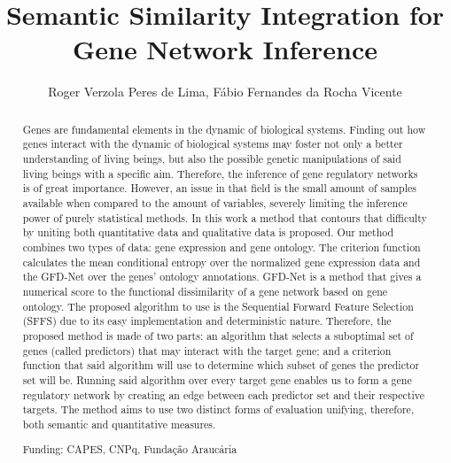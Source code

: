 \documentclass[twoside]{article}
\title{\vspace{-15mm}\fontsize{24pt}{10pt}\selectfont\textbf{ Semantic Similarity Integration for Gene Network Inference }} %
\author{ Roger Verzola Peres de Lima, F\'abio Fernandes da Rocha Vicente }
\affil{ Federal University of Technology - Paran\'a }
\date{}
\begin{document}
  
  
  \maketitle %
  
  
  \thispagestyle{fancy} %
  
  
  \begin{abstract}
  Genes are fundamental elements in the dynamic of biological systems. Finding out how genes interact with the dynamic of biological systems may foster not only a better understanding of living beings,  but also the possible genetic manipulations of said living beings with a specific aim. Therefore,  the inference of gene regulatory networks is of great importance. However,  an issue in that field is the small amount of samples available when compared to the amount of variables,  severely limiting the inference power of purely statistical methods. In this work a method that contours that difficulty by uniting both quantitative data and qualitative data is proposed.  Our method combines two types of data: gene expression and gene ontology. The criterion function calculates the mean conditional entropy over the normalized gene expression data and the GFD-Net over the genes’ ontology annotations. GFD-Net is a method that gives a numerical score to the functional dissimilarity of a gene network based on gene ontology. The proposed algorithm to use is the Sequential Forward Feature Selection (SFFS) due to its easy implementation and deterministic nature.  Therefore,  the proposed method is made of two parts: an algorithm that selects a suboptimal set of genes (called predictors) that may interact with the target gene; and a criterion function that said algorithm will use to determine which subset of genes the predictor set will be. Running said algorithm over every target gene enables us to form a gene regulatory network by creating an edge between each predictor set and their respective targets.  The method aims to use two distinct forms of evaluation unifying,  therefore,  both semantic and quantitative measures.
  
  Funding: CAPES,  CNPq,  Funda\c{c}\~ao Arauc\'aria \\ 
  \end{abstract}
  
\end{document}
